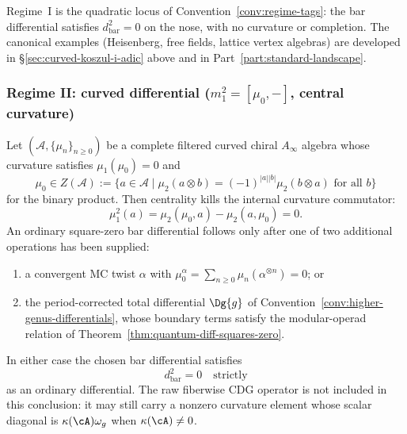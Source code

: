 Regime~I is the quadratic locus of Convention~\ref{conv:regime-tags}: the bar differential satisfies $d_{\mathrm{bar}}^2 = 0$ on the nose, with no curvature or completion. The canonical examples (Heisenberg, free fields, lattice vertex algebras) are developed in \S\ref{sec:curved-koszul-i-adic} above and in Part~\ref{part:standard-landscape}.

\subsubsection{\texorpdfstring{Regime II: curved differential ($m_1^2 = [\mu_0, -]$, central curvature)}{Regime II: curved differential (m1 squared = commutator with mu0, central curvature)}}

\begin{theorem}\label{thm:central-implies-strict}
Let $(\mathcal{A},\{\mu_n\}_{n\geq0})$ be a complete filtered curved
chiral $A_\infty$ algebra whose curvature satisfies $\mu_1(\mu_0)=0$
and
\begin{equation}
\mu_0 \in Z(\mathcal{A}) := \{a \in \mathcal{A} \mid \mu_2(a \otimes b) = (-1)^{|a||b|}\mu_2(b \otimes a)
\text{ for all } b\}
\end{equation}
for the binary product. Then centrality kills the internal curvature
commutator:
\begin{equation}\label{eq:curved-m1-squared}
\mu_1^2(a)=\mu_2(\mu_0,a)-\mu_2(a,\mu_0)=0.
\end{equation}
An ordinary square-zero bar differential follows only after one of two
additional operations has been supplied:
\begin{enumerate}[label=\textup{(\roman*)}]
\item a convergent MC twist $\alpha$ with
$\mu_0^\alpha=\sum_{n\ge0}\mu_n(\alpha^{\otimes n})=0$; or
\item the period-corrected total differential $\Dg{g}$ of
Convention~\ref{conv:higher-genus-differentials}, whose boundary
terms satisfy the modular-operad relation of
Theorem~\ref{thm:quantum-diff-squares-zero}.
\end{enumerate}
In either case the chosen bar differential satisfies
\begin{equation}
d_{\text{bar}}^2 = 0 \quad \text{strictly}
\end{equation}
as an ordinary differential. The raw fiberwise CDG operator is not
included in this conclusion: it may still carry a nonzero curvature
element whose scalar diagonal is $\kappa(\cA)\omega_g$ when
$\kappa(\cA)\neq0$.
\end{theorem}

